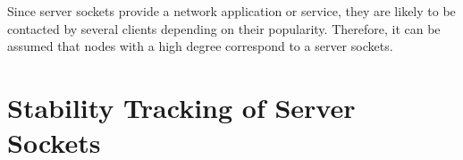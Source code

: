 Since server sockets provide a network application or service, they are likely
to be contacted by several clients depending on their popularity. Therefore, it
can be assumed that nodes with a high degree correspond to a server sockets.

\section{Stability Tracking of Server Sockets 
\label{section:socket_tracking}}